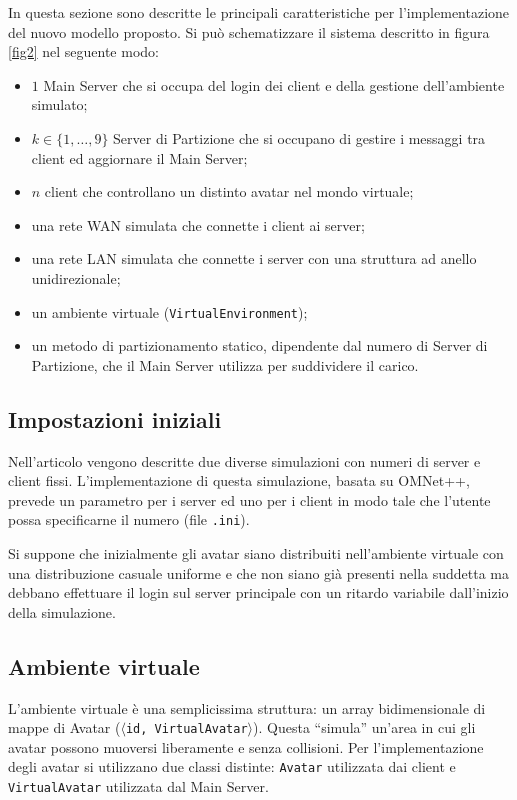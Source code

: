 \documentclass[a4paper, 11pt, oneside]{book}
\theoremstyle{definition}
\theoremstyle{remark}
\begin{document}
In questa sezione sono descritte le principali caratteristiche per
l'implementazione del nuovo modello proposto. Si può schematizzare il
sistema descritto in figura \ref{fig2} nel seguente modo:
\begin{itemize}
\item
$1$ Main Server che si occupa del login dei client e della gestione
dell'ambiente simulato;
\item
$k \in \{1, \ldots, 9\}$ Server di Partizione che si occupano di gestire i
messaggi tra client ed aggiornare il Main Server;
\item
$n$ client che controllano un distinto avatar nel mondo virtuale;
\item
una rete WAN simulata che connette i client ai server;
\item
una rete LAN simulata che connette i server con una struttura ad anello
unidirezionale;
\item
un ambiente virtuale (\texttt{VirtualEnvironment});
\item
un metodo di partizionamento statico, dipendente dal numero di Server di
Partizione, che il Main Server utilizza per suddividere il carico.
\end{itemize}

\subsection{Impostazioni iniziali}
Nell'articolo vengono descritte due diverse simulazioni con numeri di server
e client fissi. L'implementazione di questa simulazione, basata su OMNet++,
prevede un parametro per i server ed uno per i client in modo tale che l'utente
possa specificarne il numero (file \texttt{.ini}).

Si suppone che inizialmente gli avatar siano distribuiti nell'ambiente virtuale
con una distribuzione casuale uniforme e che non siano già presenti nella
suddetta ma debbano effettuare il login sul server principale con un ritardo
variabile dall'inizio della simulazione.

\subsection{Ambiente virtuale}
L'ambiente virtuale è una semplicissima struttura: un array
bidimensionale di mappe di Avatar
(\texttt{$\langle$id, VirtualAvatar$\rangle$}).
Questa ``simula'' un'area in cui gli avatar possono muoversi liberamente e
senza collisioni. Per l'implementazione degli avatar si utilizzano due classi
distinte: \texttt{Avatar} utilizzata dai client e
\texttt{VirtualAvatar} utilizzata dal Main Server.
\end{document}
